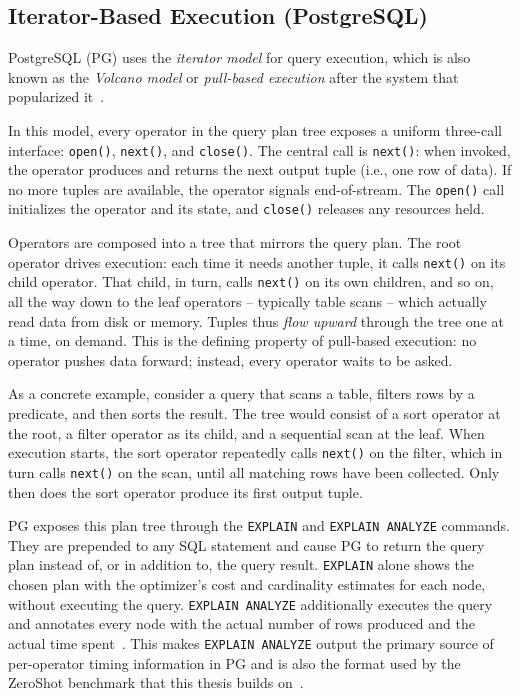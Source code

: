 \subsection{Iterator-Based Execution (PostgreSQL)}

PostgreSQL (PG) uses the \emph{iterator model} for query execution, which is also known as the \emph{Volcano model} or \emph{pull-based execution} after the system that popularized it~\parencite{graefe1994}.

In this model, every operator in the query plan tree exposes a uniform three-call interface: \texttt{open()}, \texttt{next()}, and \texttt{close()}.
The central call is \texttt{next()}: when invoked, the operator produces and returns the next output tuple (i.e., one row of data).
If no more tuples are available, the operator signals end-of-stream.
The \texttt{open()} call initializes the operator and its state, and \texttt{close()} releases any resources held.

Operators are composed into a tree that mirrors the query plan.
The root operator drives execution: each time it needs another tuple, it calls \texttt{next()} on its child operator.
That child, in turn, calls \texttt{next()} on its own children, and so on, all the way down to the leaf operators -- typically table scans -- which actually read data from disk or memory.
Tuples thus \emph{flow upward} through the tree one at a time, on demand.
This is the defining property of pull-based execution: no operator pushes data forward; instead, every operator waits to be asked.

As a concrete example, consider a query that scans a table, filters rows by a predicate, and then sorts the result.
The tree would consist of a sort operator at the root, a filter operator as its child, and a sequential scan at the leaf.
When execution starts, the sort operator repeatedly calls \texttt{next()} on the filter, which in turn calls \texttt{next()} on the scan, until all matching rows have been collected.
Only then does the sort operator produce its first output tuple.

PG exposes this plan tree through the \texttt{EXPLAIN} and \texttt{EXPLAIN ANALYZE} commands.
They are prepended to any SQL statement and cause PG to return the query plan instead of, or in addition to, the query result.
\texttt{EXPLAIN} alone shows the chosen plan with the optimizer's cost and cardinality estimates for each node, without executing the query.
\texttt{EXPLAIN ANALYZE} additionally executes the query and annotates every node with the actual number of rows produced and the actual time spent~\parencite{postgresql_docs_query_path}.
This makes \texttt{EXPLAIN ANALYZE} output the primary source of per-operator timing information in PG and is also the format used by the ZeroShot benchmark that this thesis builds on~\parencite{zeroshot}.

